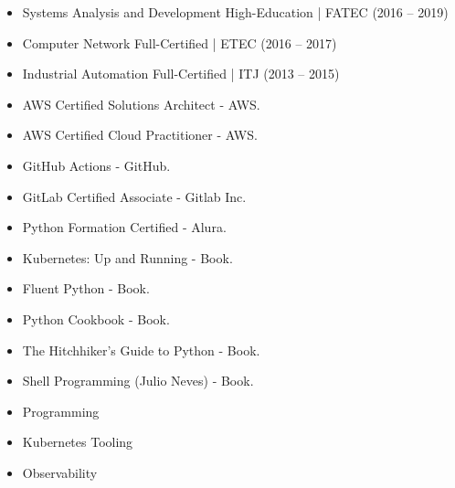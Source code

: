 
\begin{itemize}
    \item Systems Analysis and Development \newline High-Education | FATEC (2016 -- 2019)
    \item Computer Network \newline Full-Certified | ETEC (2016 -- 2017)
    \item Industrial Automation \newline Full-Certified | ITJ (2013 -- 2015)
\end{itemize}


\begin{itemize}
    \item AWS Certified Solutions Architect - AWS.
    \item AWS Certified Cloud Practitioner - AWS.
    \item GitHub Actions - GitHub.
    \item GitLab Certified Associate - Gitlab Inc.
    \item Python Formation Certified - Alura.
    \item Kubernetes: Up and Running - Book.
    \item Fluent Python - Book.
    \item Python Cookbook - Book.
    \item The Hitchhiker's Guide to Python - Book.
    \item Shell Programming (Julio Neves) - Book.
\end{itemize}


\begin{itemize}
    \item Programming
\end{itemize}


\divider

\begin{itemize}
    \item Kubernetes Tooling
\end{itemize}


\divider

\begin{itemize}
    \item Observability
\end{itemize}

